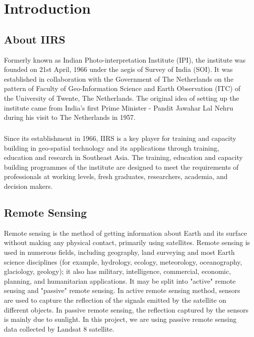 \documentclass[12pt, a4paper]{report}
\begin{document}
\tableofcontents
\listoffigures

\setcounter{page}{1}
\setcounter{secnumdepth}{2}
\chapter{Introduction}
\section{About IIRS}
Formerly known as Indian Photo-interpretation Institute (IPI), the institute was founded on 21st April, 1966 under the aegis of Survey of India (SOI). It was established in collaboration with the Government of The Netherlands on the pattern of Faculty of Geo-Information Science and Earth Observation (ITC) of the University of Twente, The Netherlands. The original idea of setting up the institute came from India's first Prime Minister - Pandit Jawahar Lal Nehru during his visit to The Netherlands in 1957. 
\paragraph{}
Since its establishment in 1966, IIRS is a key player for training and capacity building in geo-spatial technology and its applications through training, education and research in Southeast Asia. The training, education and capacity building programmes of the institute are designed to meet the requirements of professionals at working levels, fresh graduates, researchers, academia, and decision makers.
\cite{iirs.about.history, iirs.about.instiprof}
\section{Remote Sensing}
Remote sensing is the method of getting information about Earth and its surface without making any physical contact, primarily using satellites. Remote sensing is used in numerous fields, including geography, land surveying and most Earth science disciplines (for example, hydrology, ecology, meteorology, oceanography, glaciology, geology); it also has military, intelligence, commercial, economic, planning, and humanitarian applications.\cite{remotesensingwiki}
It may be split into "active" remote sensing and "passive" remote sensing. In active remote sensing method, sensors are used to capture the reflection of the signals emitted by the satellite on different objects. In passive remote sensing, the reflection captured by the sensors is mainly due to sunlight. In this project, we are using passive remote sensing data collected by Landsat 8 satellite.
\end{document}
